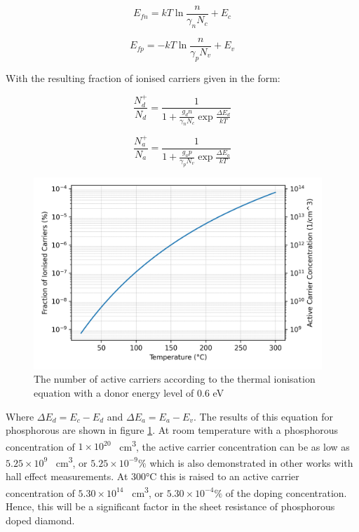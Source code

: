 \begin{equation}
    E_{fn} = kT\ln{\frac{n}{\gamma_{n}N_{c}}}+E_{c}
    \label{eq:quasi-fermi_levels_carriers_n}
\end{equation}

\begin{equation}
    E_{fp} = -kT\ln{\frac{n}{\gamma_{p}N_{v}}}+E_{v}
    \label{eq:quasi-fermi_levels_carriers_p}
\end{equation}

With the resulting fraction of ionised carriers given in the form:

\begin{equation}
    \frac{N_{d}^{+}}{N_{d}} = \frac{1}{1+\frac{g_{d}n}{\gamma_{n}N_{c}}\exp{\frac{\Delta E_{d}}{kT}}}
    \label{eq:incomplete_ionisation_final_n}
\end{equation}

\begin{equation}
    \frac{N_{a}^{+}}{N_{a}} = \frac{1}{1+\frac{g_{a}p}{\gamma_{p}N_{v}}\exp{\frac{\Delta E_{a}}{kT}}}
    \label{eq:incomplete_ionisation_final_p}
\end{equation}

\begin{figure}[h]
    \centering
    \includegraphics[width=0.97\textwidth]{active_carriers.png}
    \caption{The number of active carriers according to the thermal ionisation equation with a donor energy level of 0.6 \si{\electronvolt}}
    \label{fig:active_carriers}
\end{figure}

Where $\Delta E_{d}=E_{c}-E_{d}$ and $\Delta E_{a}=E_{a}-E_{v}$. The results of this equation for phosphorous are shown in figure \ref{fig:active_carriers}. At room temperature with a phosphorous concentration of $1\times10^{20}$ \si{\per\centi\metre\cubed}, the active carrier concentration can be as low as $5.25\times10^{9}$ \si{\per\centi\metre\cubed}, or $5.25\times10^{-9}\%$ which is also demonstrated in other works with hall effect measurements. At 300\si{\degreeCelsius} this is raised to an active carrier concentration of $5.30\times10^{14}$ \si{\per\centi\metre\cubed}, or $5.30\times10^{-4}\%$ of the doping concentration. Hence, this will be a significant factor in the sheet resistance of phosphorous doped diamond. 


